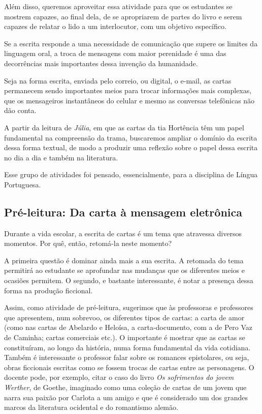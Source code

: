 \documentclass[12pt]{extarticle}
\begin{document}
Além disso, queremos aproveitar essa atividade para que os estudantes se
mostrem capazes, ao final dela, de se apropriarem de partes do livro e
serem capazes de relatar o lido a um interlocutor, com um objetivo
específico.

Se a escrita responde a uma necessidade de comunicação que supere os
limites da linguagem oral, a troca de mensagens com maior perenidade é
uma das decorrências mais importantes dessa invenção da humanidade.

Seja na forma escrita, enviada pelo correio, ou digital, o e-mail, as
cartas permanecem sendo importantes meios para trocar informações mais
complexas, que os mensageiros instantâneos do celular e mesmo as
conversas telefônicas não dão conta.

A partir da leitura de \emph{Júlia}, em que as cartas da tia Hortência
têm um papel fundamental na compreensão da trama, buscaremos ampliar o
domínio da escrita dessa forma textual, de modo a produzir uma reflexão
sobre o papel dessa escrita no dia a dia e também na literatura.

Esse grupo de atividades foi pensado, essencialmente, para a disciplina
de Língua Portuguesa.


\subsection{Pré-leitura: Da carta à mensagem eletrônica}

Durante a vida escolar, a escrita de cartas é um tema que atravessa
diversos momentos. Por quê, então, retomá-la neste momento?

A primeira questão é dominar ainda mais a sua escrita. A retomada do
tema permitirá ao estudante se aprofundar nas mudanças que os diferentes
meios e ocasiões permitem. O segundo, e bastante interessante, é notar a
presença dessa forma na produção ficcional.

Assim, como atividade de pré-leitura, sugerimos que às professoras e
professores que apresentem, num sobrevoo, os diferentes tipos de cartas:
a carta de amor (como nas cartas de Abelardo e Heloísa, a
carta-documento, com a de Pero Vaz de Caminha; cartas comerciais etc.).
O importante é mostrar que as cartas se constituíram, ao longo da
história, numa forma fundamental da vida cotidiana. Também é
interessante o professor falar sobre os romances epistolares, ou seja,
obras ficcionais escritas como se fossem trocas de cartas entre as
personagens. O docente pode, por exemplo, citar o caso do livro \emph{Os
sofrimentos do jovem Werther}, de Goethe, imaginado como uma coleção de
cartas de um jovem que narra sua paixão por Carlota a um amigo e que é
considerado um dos grandes marcos da literatura ocidental e do
romantismo alemão.
\end{document}
